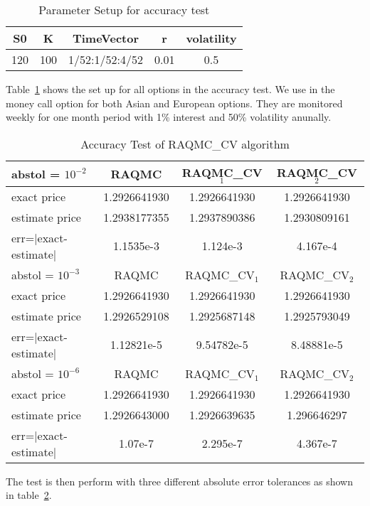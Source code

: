 \begin{table}[h]
    \centering
	\caption{Parameter Setup for accuracy test}
    \label{tb:accsetup}
	\begin{tabular}{ccccc}
		\hline\hline
        S0 & K & TimeVector & r & volatility \\[0.5ex]
        \hline
        120  & 100 & 1/52:1/52:4/52 & 0.01 & 0.5 \\[1ex] 
        \hline
	\end{tabular}
\end{table}
Table~\ref{tb:accsetup} shows the set up for all options in the accuracy test.
We use in the money call option for both Asian and European options. 
They are monitored weekly for one month period with 1\% interest and 50\% volatility anunally. 
\begin{table}[h]
    \centering
	\caption{Accuracy Test of RAQMC\_CV algorithm}
    \label{tb:accuracy}
    \begin{tabular}{lccc}  
    \hline \hline
    abstol = $10^{-2}$ &RAQMC&RAQMC\_CV$_1$&RAQMC\_CV$_2$\\[0.5ex]
    \hline
    exact price& 1.2926641930& 1.2926641930&1.2926641930\\[0.5ex]
    estimate price& 1.2938177355& 1.2937890386&1.2930809161\\[0.5ex]
    err=$|$exact-estimate$|$ & 1.1535e-3& 1.124e-3&4.167e-4\\[0.5ex]
    \hline
    abstol = $10^{-3}$ &RAQMC&RAQMC\_CV$_1$&RAQMC\_CV$_2$\\[0.5ex]
    \hline
    exact price& 1.2926641930& 1.2926641930&1.2926641930\\[0.5ex]
    estimate price& 1.2926529108& 1.2925687148&1.2925793049\\[0.5ex]
    err=$|$exact-estimate$|$ & 1.12821e-5& 9.54782e-5&8.48881e-5\\[0.5ex]
    \hline
    abstol = $10^{-6}$ & RAQMC&RAQMC\_CV$_1$&RAQMC\_CV$_2$\\[0.5ex]
    \hline
    exact price& 1.2926641930& 1.2926641930&1.2926641930\\[0.5ex]
    estimate price& 1.2926643000& 1.2926639635&1.296646297\\[0.5ex]
    err=$|$exact-estimate$|$ & 1.07e-7& 2.295e-7&4.367e-7\\[0.5ex]
    \hline
    \end{tabular}
\end{table}
The test is then perform with three different absolute error tolerances as shown in table~\ref{tb:accuracy}.
